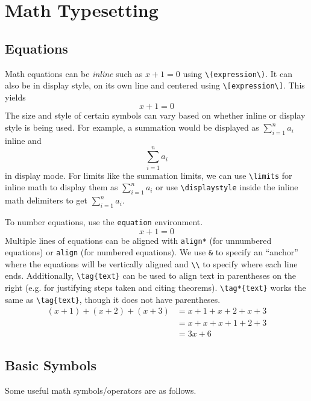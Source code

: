 \section{Math Typesetting}

\subsection{Equations}

Math equations can be \emph{inline} such as \(x + 1 = 0\) using \verb|\(expression\)|. It can also be in display
style, on its own line and centered using \verb|\[expression\]|. This yields
\[x + 1 = 0\]
The size and style of certain symbols can vary based on whether inline or display style is being used. For example, a
summation would be displayed as \(\sum_{i = 1}^{n} a_i\) inline and
\[\sum_{i = 1}^{n} a_i\]
in display mode. For limits like the summation limits, we can use \verb|\limits| for inline math to display them as
\(\sum \limits_{i = 1}^{n} a_i\) or use \verb|\displaystyle| inside the inline math delimiters to get
\(\displaystyle \sum_{i = 1}^{n} a_i\).

To number equations, use the \verb|equation| environment.
\begin{equation}
    x + 1 = 0
\end{equation}
Multiple lines of equations can be aligned with \verb|align*| (for unnumbered equations) or \verb|align| (for numbered
equations). We use \verb|&| to specify an ``anchor'' where the equations will be vertically aligned and \verb|\\| to
specify where each line ends. Additionally, \verb|\tag{text}| can be used to align text in parentheses on the right
(e.g. for justifying steps taken and citing theorems). \verb|\tag*{text}| works the same as \verb|\tag{text}|, though
it does not have parentheses.
\begin{align*}
    (x + 1) + (x + 2) + (x + 3)
     & = x + 1 + x + 2 + x + 3  \tag{by associativity} \\
     & = x + x + x + 1 + 2 + 3  \tag{by commutativity} \\
     & = 3x + 6
\end{align*}

\subsection{Basic Symbols}

Some useful math symbols/operators are as follows.

